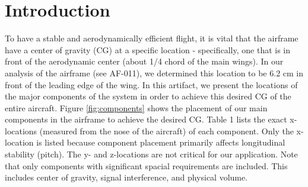 \documentclass[]{auvsi_doc}
\begin{document}
	
	\begin{AUVSITitlePage}
		\begin{artifacttable}
		\end{artifacttable}
	\end{AUVSITitlePage}
	
	\section{Introduction}
	To have a stable and aerodynamically efficient flight, it is vital that the airframe have a center of gravity (CG) at a specific location - specifically, one that is in front of the aerodynamic center (about 1/4 chord of the main wings). In our analysis of the airframe (see AF-011), we determined this location to be 6.2 cm in front of the leading edge of the wing. In this artifact, we present the locations of the major components of the system in order to achieve this desired CG of the entire aircraft. Figure \ref{fig:components} shows the placement of our main components in the airframe to achieve the desired CG. Table 1 lists the exact x-locations (measured from the nose of the aircraft) of each component. Only the x-location is listed because component placement primarily affects longitudinal stability (pitch). The y- and z-locations are not critical for our application. Note that only components with significant spacial requirements are included. This includes center of gravity, signal interference, and physical volume.
	
	
\end{document}
